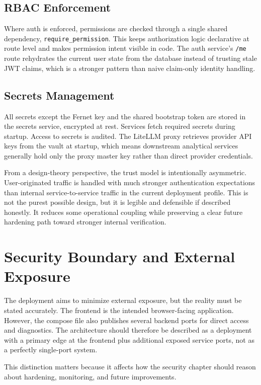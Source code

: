 \subsection{RBAC Enforcement}
Where auth is enforced, permissions are checked through a single shared dependency, \texttt{require\_permission}. This keeps authorization logic declarative at route level and makes permission intent visible in code. The auth service's \texttt{/me} route rehydrates the current user state from the database instead of trusting stale JWT claims, which is a stronger pattern than naive claim-only identity handling.

\subsection{Secrets Management}
All secrets except the Fernet key and the shared bootstrap token are stored in the secrets service, encrypted at rest. Services fetch required secrets during startup. Access to secrets is audited. The LiteLLM proxy retrieves provider API keys from the vault at startup, which means downstream analytical services generally hold only the proxy master key rather than direct provider credentials.

From a design-theory perspective, the trust model is intentionally asymmetric. User-originated traffic is handled with much stronger authentication expectations than internal service-to-service traffic in the current deployment profile. This is not the purest possible design, but it is legible and defensible if described honestly. It reduces some operational coupling while preserving a clear future hardening path toward stronger internal verification.

\section{Security Boundary and External Exposure}
The deployment aims to minimize external exposure, but the reality must be stated accurately. The frontend is the intended browser-facing application. However, the compose file also publishes several backend ports for direct access and diagnostics. The architecture should therefore be described as a deployment with a primary edge at the frontend plus additional exposed service ports, not as a perfectly single-port system.

This distinction matters because it affects how the security chapter should reason about hardening, monitoring, and future improvements.

